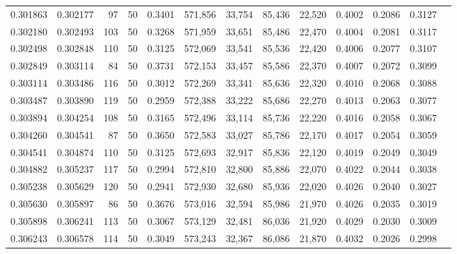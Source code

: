 \begin{tabular}{rrrrrrrrrrrrr}
0.301863 & 0.302177 &    97 &  50 &                                     0.3401 & 571,856 &  33,754 &  85,436 &  22,520 & 0.4002 & 0.2086 & 0.3127 \\
0.302180 & 0.302493 &   103 &  50 &                                     0.3268 & 571,959 &  33,651 &  85,486 &  22,470 & 0.4004 & 0.2081 & 0.3117 \\
0.302498 & 0.302848 &   110 &  50 &                                     0.3125 & 572,069 &  33,541 &  85,536 &  22,420 & 0.4006 & 0.2077 & 0.3107 \\
0.302849 & 0.303114 &    84 &  50 &                                     0.3731 & 572,153 &  33,457 &  85,586 &  22,370 & 0.4007 & 0.2072 & 0.3099 \\
0.303114 & 0.303486 &   116 &  50 &                                     0.3012 & 572,269 &  33,341 &  85,636 &  22,320 & 0.4010 & 0.2068 & 0.3088 \\
0.303487 & 0.303890 &   119 &  50 &                                     0.2959 & 572,388 &  33,222 &  85,686 &  22,270 & 0.4013 & 0.2063 & 0.3077 \\
0.303894 & 0.304254 &   108 &  50 &                                     0.3165 & 572,496 &  33,114 &  85,736 &  22,220 & 0.4016 & 0.2058 & 0.3067 \\
0.304260 & 0.304541 &    87 &  50 &                                     0.3650 & 572,583 &  33,027 &  85,786 &  22,170 & 0.4017 & 0.2054 & 0.3059 \\
0.304541 & 0.304874 &   110 &  50 &                                     0.3125 & 572,693 &  32,917 &  85,836 &  22,120 & 0.4019 & 0.2049 & 0.3049 \\
0.304882 & 0.305237 &   117 &  50 &                                     0.2994 & 572,810 &  32,800 &  85,886 &  22,070 & 0.4022 & 0.2044 & 0.3038 \\
0.305238 & 0.305629 &   120 &  50 &                                     0.2941 & 572,930 &  32,680 &  85,936 &  22,020 & 0.4026 & 0.2040 & 0.3027 \\
0.305630 & 0.305897 &    86 &  50 &                                     0.3676 & 573,016 &  32,594 &  85,986 &  21,970 & 0.4026 & 0.2035 & 0.3019 \\
0.305898 & 0.306241 &   113 &  50 &                                     0.3067 & 573,129 &  32,481 &  86,036 &  21,920 & 0.4029 & 0.2030 & 0.3009 \\
0.306243 & 0.306578 &   114 &  50 &                                     0.3049 & 573,243 &  32,367 &  86,086 &  21,870 & 0.4032 & 0.2026 & 0.2998 \\

\end{tabular}
